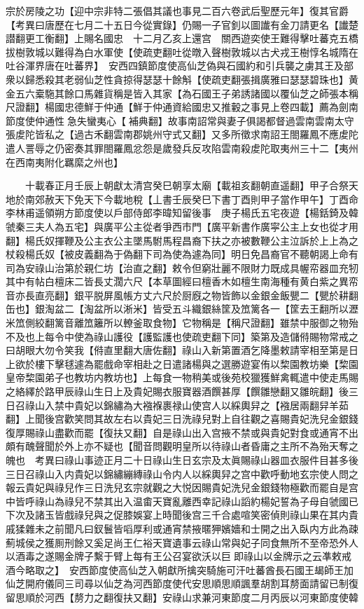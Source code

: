 宗於房陵之功【迎中宗非特二張倡其議也事見二百六卷武后聖歷元年】復其官爵　【考異曰唐歷在七月二十五日今從實錄】仍賜一子官釗以圖䜟有金刀請更名【䜟楚譛翻更工衡翻】上賜名國忠　十二月乙亥上還宫　關西遊奕使王難得擊吐蕃克五橋拔樹敦城以難得為白水軍使【使疏吏翻吐從暾入聲樹敦城以古犬戎王樹惇名城隋在吐谷渾界唐在吐蕃界】　安西四鎮節度使高仙芝偽與石國約和引兵襲之虜其王及部衆以歸悉殺其老弱仙芝性貪掠得瑟瑟十餘斛【使疏吏翻張揖廣雅曰瑟瑟碧珠也】黄金五六槖駞其餘口馬雜貨稱是皆入其家【為石國王子弟誘諸國以覆仙芝之師張本稱尺證翻】楊國忠德鮮于仲通【鮮于仲通資給國忠又推轂之事見上卷四載】薦為劍南節度使仲通性急失蠻夷心【補典翻】故事南詔常與妻子俱謁都督過雲南雲南太守張䖍陀皆私之【過古禾翻雲南郡姚州守式又翻】又多所徵求南詔王閤羅鳳不應䖍陀遣人詈辱之仍密奏其罪閤羅鳳忿怨是歲發兵反攻陷雲南殺䖍陀取夷州三十二【夷州在西南夷附化羈縻之州也】

　　十載春正月壬辰上朝獻太清宫癸巳朝享太廟【載祖亥翻朝直遥翻】甲子合祭天地於南郊赦天下免天下今載地稅【丄書壬辰癸巳下書丁酉則甲子當作甲午】丁酉命李林甫遥領朔方節度使以戶部侍郎李暐知留後事　庚子楊氏五宅夜遊【楊銛錡及韓虢秦三夫人為五宅】與廣平公主從者爭西市門【廣平新書作廣寜公主上女也從才用翻】楊氏奴揮鞭及公主衣公主墜馬駙馬程昌裔下扶之亦被數鞭公主泣訴於上上為之杖殺楊氏奴【被皮義翻為于偽翻下司為使為遽為同】明日免昌裔官不聽朝謁上命有司為安祿山治第於親仁坊【治直之翻】敕令但窮壯麗不限財力既成具幄帟器皿充牣其中有帖白檀床二皆長丈濶六尺【本草圖經曰檀香木如檀生南海種有黄白紫之異帟音亦長直亮翻】銀平脱屏風帳方丈六尺於厨廐之物皆飾以金銀金飯甖二【甖於耕翻缶也】銀淘盆二【淘盆所以淅米】皆受五斗織銀絲筐及笟篱各一【筐去王翻所以瀝米笟側絞翻篱音離笟籬所以轑釜取食物】它物稱是【稱尺證翻】雖禁中服御之物殆不及也上每令中使為祿山護役【護監護也使疏吏翻下同】築第及造儲偫賜物常戒之曰胡眼大勿令笑我【偫直里翻大唐佐翻】祿山入新第置酒乞降墨敕請宰相至第是日上欲於樓下擊毬遽為罷戲命宰相赴之日遣諸楊與之選勝遊宴侑以棃園教坊樂【棃園皇帝棃園弟子也教坊内教坊也】上每食一物稍美或後苑校獵獲鮮禽輒遣中使走馬賜之絡繹於路甲辰祿山生日上及貴妃賜衣服寶器酒饌甚厚【饌雛戀翻又雛皖翻】後三日召祿山入禁中貴妃以錦繡為大襁褓裹禄山使宫人以綵輿舁之【襁居兩翻舁羊茹翻】上聞後宫歡笑問其故左右以貴妃三日洗祿兒對上自往觀之喜賜貴妃洗兒金銀錢復厚賜祿山盡歡而罷【復扶又翻】自是祿山出入宫掖不禁或與貴妃對食或通宵不出頗有醜聲聞於外上亦不疑也【聞音問觀明皇所以待祿山者昏庸之主所不為殆天奪之魄也　考異曰祿山事迹正月二十日祿山生日玄宗及太眞賜祿山器皿衣服件目甚多後三日召祿山入内貴妃以錦繡繃縳祿山令内人以綵輿舁之宫中歡呼動地玄宗使人問之報云貴妃與祿兒作三日洗兒玄宗就觀之大悦因賜貴妃洗兒金銀錢物極歡而罷自是宫中皆呼祿山為祿兒不禁其出入温畬天寶亂離西幸記祿山謟約楊妃誓為子母自虢國已下次及諸玉皆戲祿兒與之促膝娛宴上時聞後宫三千合處喧笑密偵則祿山果在其内貴戚猱雜未之前聞凡曰釵鬟皆㗖厚利或通宵禁掖暱狎嬪嬙和士開之出入臥内方此為疎薊城侯之獲厠刑餘又奚足尚王仁裕天寶遺事云祿山常與妃子同食無所不至帝恐外人以酒毒之遂賜金牌子繫于臂上每有王公召宴欲沃以巨即祿山以金牌示之云凖敕戒酒今略取之】　安西節度使高仙芝入朝獻所擒突騎施可汗吐蕃酋長石國王朅師王加仙芝開府儀同三司尋以仙芝為河西節度使代安思順思順諷羣胡割耳剺面請留已制復留思順於河西【剺力之翻復扶又翻】安祿山求兼河東節度二月丙辰以河東節度使韓

